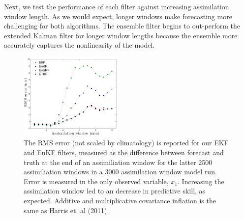 
Next, we test the performance of each filter against increasing assimilation window length.
As we would expect, longer windows make forecasting more challenging for both algorithms.
The ensemble filter begins to out-perform the extended Kalman filter for longer window lengths because the ensemble more accurately captures the nonlinearity of the model.

\begin{figure}[h!]
  \centering
  \includegraphics[width=0.45\textwidth]{figures/window_experiment_plot002.pdf}
  \caption[The RMS error is reported for our EKF and EnKF filters]{
    The RMS error (not scaled by climatology) is reported for our EKF and EnKF filters, measured as the difference between forecast and truth at the end of an assimiliation window for the latter 2500 assimiliation windows in a 3000 assimilation window model run.
    Error is measured in the only observed variable, $x_1$.
    Increasing the assimilation window led to an decrease in predictive skill, as expected.
    Additive and multiplicative covariance inflation is the same as Harris et. al (2011).
  }
  \label{fig:window_test}
\end{figure}


